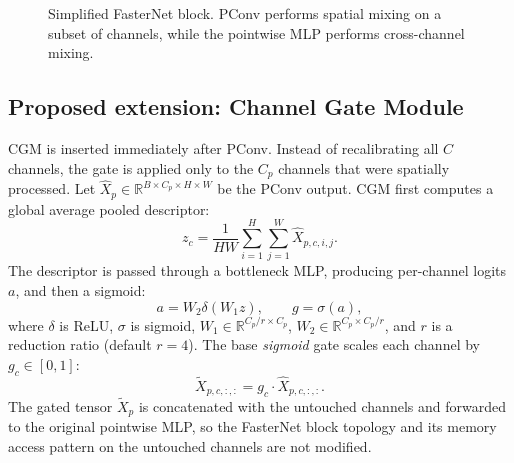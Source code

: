 \documentclass{article}
\begin{document}
\begin{figure}[t]
\centering
{}
\caption{Simplified FasterNet block. PConv performs spatial mixing on a subset of channels, while the pointwise MLP performs cross-channel mixing.}
\label{fig:base_block}
\end{figure}

\subsection{Proposed extension: Channel Gate Module}

CGM is inserted immediately after PConv. Instead of recalibrating all $C$ channels, the gate is applied only to the $C_p$ channels that were spatially processed. Let $\hat{X}_p \in \mathbb{R}^{B \times C_p \times H \times W}$ be the PConv output. CGM first computes a global average pooled descriptor:
\begin{equation}
z_c = \frac{1}{HW}\sum_{i=1}^{H}\sum_{j=1}^{W} \hat{X}_{p,c,i,j}.
\end{equation}
The descriptor is passed through a bottleneck MLP, producing per-channel logits $a$, and then a sigmoid:
\begin{equation}
a = W_2 \delta(W_1 z), \qquad g = \sigma(a),
\end{equation}
where $\delta$ is ReLU, $\sigma$ is sigmoid, $W_1 \in \mathbb{R}^{C_p/r \times C_p}$, $W_2 \in \mathbb{R}^{C_p \times C_p/r}$, and $r$ is a reduction ratio (default $r{=}4$). The base \emph{sigmoid} gate scales each channel by $g_c \in [0,1]$:
\begin{equation}
\tilde{X}_{p,c,:,:} = g_c \cdot \hat{X}_{p,c,:,:}.
\end{equation}
The gated tensor $\tilde{X}_p$ is concatenated with the untouched channels and forwarded to the original pointwise MLP, so the FasterNet block topology and its memory access pattern on the untouched channels are not modified.
\end{document}

